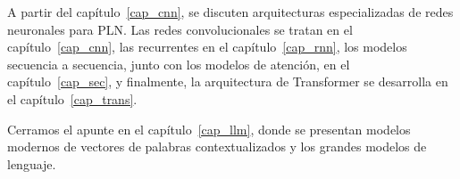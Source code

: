 A partir del capítulo~\ref{cap_cnn}, se discuten arquitecturas especializadas de redes neuronales para PLN. Las redes convolucionales se tratan en el capítulo~\ref{cap_cnn}, las recurrentes en el capítulo~\ref{cap_rnn}, los modelos secuencia a secuencia, junto con los modelos de atención, en el capítulo~\ref{cap_sec}, y finalmente, la arquitectura de Transformer se desarrolla en el capítulo~\ref{cap_trans}.

Cerramos el apunte en el capítulo~\ref{cap_llm}, donde se presentan modelos modernos de vectores de palabras contextualizados y los grandes modelos de lenguaje.
